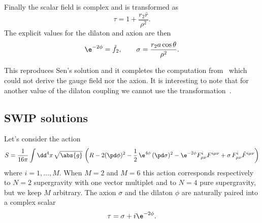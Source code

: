 Finally the scalar field is complex and is transformed as
\begin{equation}
	\tau = 1 + \frac{r_2 \bar r}{\rho^2}.
\end{equation} 
The explicit values for the dilaton and axion are then
\begin{equation}
	\e^{-2\phi} = \tilde f_2, \qquad
	\sigma = \frac{r_2 a \cos \theta}{\rho^2}.
\end{equation} 

This reproduces Sen's solution and it completes the computation from~\cite{Yazadjiev:2000:NewmanJanisMethodRotating} which could not derive the gauge field nor the axion.
It is interesting to note that for another value of the dilaton coupling we cannot use the transformation~\cite{Horne:1992:RotatingDilatonBlack, Pirogov:2013:RotatingScalarvacuumBlack}.\footnotemark{}%


\subsection{SWIP solutions}
\label{sec:examples:swip}


Let's consider the action~\cites{Bergshoeff:1996:StationaryAxionDilatonSolutions}[sec.~12.2]{Ortin:2004:GravityStrings}
\begin{equation}
	\label{ex:eq:action:swip}
	S = \frac{1}{16 \pi} \int \dd^4 x\, \sqrt{\abs{g}}\, \left( R
		- 2 (\pd \phi)^2 - \frac{1}{2}\, \e^{4\phi}\, (\pd \sigma)^2
		- \e^{-2\phi} F^i_{\mu\nu} F^{i\mu\nu} + \sigma\, F^i_{\mu\nu} \tilde{F}^{i\mu\nu} \right)
\end{equation} 
where $i = 1, \ldots, M$.
When $M = 2$ and $M = 6$ this action corresponds respectively to $N = 2$ supergravity with one vector multiplet and to $N = 4$ pure supergravity, but we keep $M$ arbitrary.
The axion $\sigma$ and the dilaton $\phi$ are naturally paired into a complex scalar
\begin{equation}
	\tau = \sigma + i \e^{-2\phi}.
\end{equation} 

